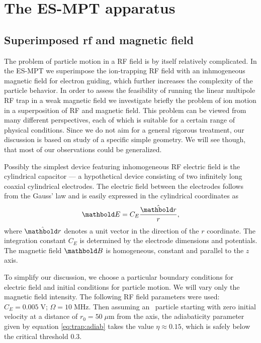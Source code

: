 
\chapter{The ES-MPT apparatus}

\label{ch:ESMPT}

\section{Superimposed rf and magnetic field}
The problem of particle motion in a \ac{RF} field is by itself
relatively complicated. In the \ac{ES-MPT} we superimpose
the ion-trapping \ac{RF} field with an inhmogeneous magnetic
field for electron guiding, which further increases the complexity
of the particle behavior. In order to assess the feasibility of
running the linear multipole \ac{RF} trap in a weak magnetic field
we investigate briefly the problem of ion motion in a superposition
of \ac{RF} and magnetic field. This problem can be viewed from
many different perspectives, each of which is suitable for
a certain range of physical conditions. Since we do not aim for a
general rigorous treatment, our discussion is based on study
of a specific simple geometry. We will see though, that most
of our observations could be generalized.

Possibly the simplest device featuring inhomogeneous RF electric
field is the cylindrical capacitor --- a hypothetical device
consisting of two infinitely long coaxial cylindrical electrodes.
The electric field between the electrodes follows from the Gauss' law
and is easily expressed in the cylindrical coordinates as
\begin{equation}
\mb E = C_E\frac{\hat {\mb r}}{r},
\label{eq:esmpt:magnetronfield}
\end{equation}
where $\hat{\mb r}$ denotes a unit vector in the direction of the $r$
coordinate. The integration constant $C_E$ is determined by the
electrode dimensions and potentials. The magnetic field $\mb B$ is
homogeneous, constant and parallel to the $z$ axis.

To simplify our discussion, we choose a particular
boundary conditions for electric field and initial conditions
for particle motion. We will vary only the magnetic field
intensity. The following \ac{RF} field
parameters were used:
$C_E = 0.005\;\text{V}$; $\Omega=10\;\text{MHz}$.
Then assuming an \Hminus\ particle starting with zero
initial velocity at a distance of $r_0=50\;\mu\text{m}$ from the
axis, the adiabaticity parameter given by equation
\eqref{eq:trap:adiab} takes the value $\eta\approx 0.15$, which
is safely below the critical threshold $0.3$.

